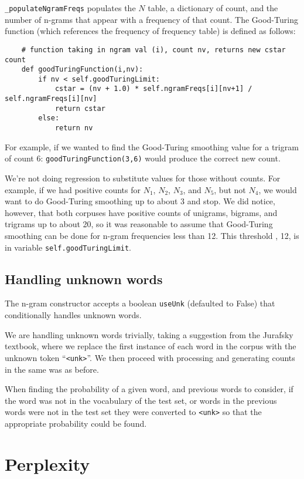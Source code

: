 \documentclass{article}
\begin{document}
\texttt{\_populateNgramFreqs} populates the $N$ table, a dictionary of count, and the number of n-grams that appear with a frequency of that count. The Good-Turing function (which references the frequency of frequency table) is defined as follows:

{\small\begin{verbatim}
    # function taking in ngram val (i), count nv, returns new cstar count
    def goodTuringFunction(i,nv):
        if nv < self.goodTuringLimit:
            cstar = (nv + 1.0) * self.ngramFreqs[i][nv+1] / self.ngramFreqs[i][nv]
            return cstar
        else:
            return nv
\end{verbatim}}

For example, if we wanted to find the Good-Turing smoothing value for a trigram of count 6: \texttt{goodTuringFunction(3,6)} would produce the correct new count.

We're not doing regression to substitute values for those without counts. For example, if we had positive counts for $N_1$, $N_2$, $N_3$, and $N_5$, but not $N_4$, we would want to do Good-Turing smoothing up to about 3 and stop. We did notice, however, that both corpuses have positive counts of unigrams, bigrams, and trigrams up to about 20, so it was reasonable to assume that Good-Turing smoothing can be done for n-gram frequencies less than 12. This threshold , 12, is in variable \texttt{self.goodTuringLimit}.

\subsection{Handling unknown words}
The n-gram constructor accepts a boolean \texttt{useUnk} (defaulted to False) that conditionally handles unknown words.\par
We are handling unknown words trivially, taking a suggestion from the Jurafsky textbook, where we replace the first instance of each word in the corpus with the unknown token ``\texttt{<unk>}''. We then proceed with processing and generating counts in the same was as before.

When finding the probability of a given word, and previous words to consider, if the word was not in the vocabulary of the test set, or words in the previous words were not in the test set they were converted to \texttt{<unk>} so that the appropriate probability could be found.

\section{Perplexity}
\end{document}
